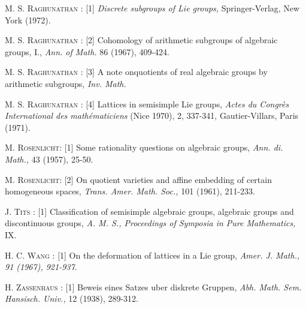 \begin{thebibliography}{99}
 \textsc{M. S. Raghunathan :} [1] \textit{Discrete subgroups of Lie groups,} Springer-Verlag, New York (1972).

 \textsc{M. S. Raghunathan :} [2] Cohomology of arithmetic subgroups of algebraic groups, I., \textit{Ann. of Math.} 86 (1967), 409-424.

 \textsc{M. S. Raghunathan :} [3] A note on\pageoriginale quotients of real algebraic groups by arithmetic subgroups, \textit{Inv. Math.}

 \textsc{M. S. Raghunathan :} [4] Lattices in semisimple Lie groups, \textit{Actes du Congr\`es International des math\'ematiciens} (Nice 1970), 2, 337-341, Gautier-Villars, Paris (1971).

 \textsc{M. Rosenlicht:} [1] Some rationality questions on algebraic groups, \textit{Ann. di. Math.,} 43 (1957),  25-50.

 \textsc{M. Rosenlicht:} [2] On quotient varieties and affine embedding of certain homogeneous spaces, \textit{Trans. Amer. Math. Soc.,} 101 (1961), 211-233.

 \textsc{J. Tits : } [1] Classification of semisimple algebraic groups, algebraic groups and discontinuous groups, \textit{A. M. S., Proceedings of Symposia in Pure Mathematics,} IX.

 \textsc{H. C. Wang :} [1] On the deformation of lattices in a Lie group, \textit{Amer. J. Math., 91 (1967), 921-937}.

 \textsc{H. Zassenhaus : } [1] Beweis eines Satzes uber diskrete Gruppen, \textit{Abh. Math. Sem. Hansisch. Univ.,} 12 (1938), 289-312.
\end{thebibliography}

